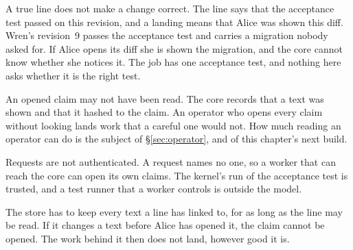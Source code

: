 \begin{pdboundary}
\setlength{\parskip}{4pt plus 1pt}
A true line does not make a change correct. The line says that the
acceptance test passed on this revision, and a landing means that Alice
was shown this diff. Wren's revision~9 passes the acceptance test and
carries a migration nobody asked for. If Alice opens its diff she is shown
the migration, and the core cannot know whether she notices it. The job
has one acceptance test, and nothing here asks whether it is the right
test.

An opened claim may not have been read. The core records that a text was
shown and that it hashed to the claim. An operator who opens every claim
without looking lands work that a careful one would not. How much reading
an operator can do is the subject of \S\ref{sec:operator}, and of this
chapter's next build.

Requests are not authenticated. A request names no one, so a worker that
can reach the core can open its own claims. The kernel's run of the
acceptance test is trusted, and a test runner that a worker controls is
outside the model.

The store has to keep every text a line has linked to, for as long as the
line may be read. If it changes a text before Alice has opened it, the
claim cannot be opened. The work behind it then does not land, however
good it is.
\end{pdboundary}
